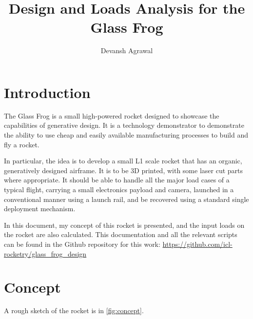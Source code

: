 \documentclass[11pt]{article}
\title{Design and Loads Analysis for  the Glass Frog}
\author{Devansh Agrawal}
\begin{document}
\maketitle


\section{Introduction}

The Glass Frog is a small high-powered rocket designed to showcase the capabilities of generative design. It is a technology demonstrator to demonstrate the ability to use cheap and easily available manufacturing processes to build and fly a rocket. 

In particular, the idea is to develop a small L1 scale rocket that has an organic, generatively designed airframe. It is to be 3D printed, with some laser cut parts where appropriate. It should be able to handle all the major load cases of a typical flight, carrying a small electronics payload and camera, launched in a conventional manner using a launch rail, and be recovered using a standard single deployment mechanism. 

In this document, my concept of this rocket is presented, and the input loads on the rocket are also calculated. This documentation and all the relevant scripts can be found in the Github repository for this work: \url{https://github.com/icl-rocketry/glass_frog_design}

\section{Concept}

A rough sketch of the rocket is in \autoref{fig:concept}. 
\end{document}
